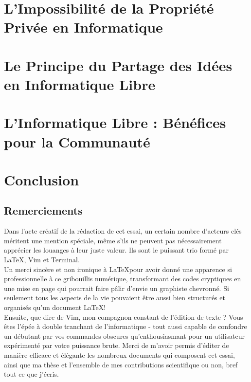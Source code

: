 \documentclass[10pt]{book}
\begin{document}
\chapter{L'Impossibilité de la Propriété Privée en Informatique}

\chapter{Le Principe du Partage des Idées en Informatique Libre}

\chapter{L'Informatique Libre : Bénéfices pour la Communauté}


\chapter*{Conclusion}


\section*{Remerciements}
Dans l'acte créatif de la rédaction de cet essai, un certain nombre d'acteurs clés méritent une mention spéciale, même s'ils ne peuvent pas nécessairement apprécier les louanges à leur juste valeur. Ils sont le puissant trio formé par \LaTeX, Vim et Terminal.\\

Un merci sincère et non ironique à \LaTeX pour avoir donné une apparence si professionnelle à ce gribouillis numérique, transformant des codes cryptiques en une mise en page qui pourrait faire pâlir d'envie un graphiste chevronné. Si seulement tous les aspects de la vie pouvaient être aussi bien structurés et organisés qu'un document \LaTeX !\\

Ensuite, que dire de Vim, mon compagnon constant de l'édition de texte ? Vous êtes l'épée à double tranchant de l'informatique - tout aussi capable de confondre un débutant par vos commandes obscures qu'enthousiasmant pour un utilisateur expérimenté par votre puissance brute. Merci de m'avoir permis d'éditer de manière efficace et élégante les nombreux documents qui composent cet essai, ainsi que ma thèse et l'ensemble de mes contributions scientifique ou non, bref tout ce que j'écris.\\

\end{document}
